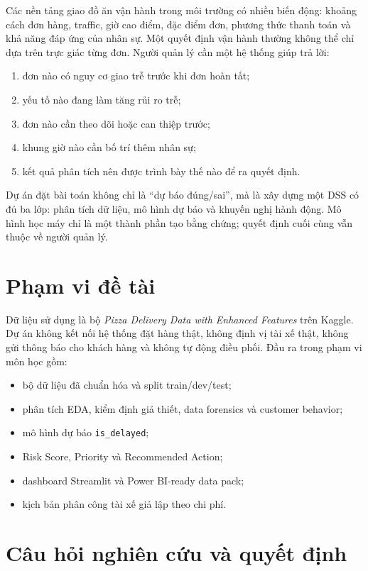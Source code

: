\documentclass[12pt,a4paper,oneside]{report}
\newcommand{\code}[1]{\nolinkurl{#1}}
\begin{document}
Các nền tảng giao đồ ăn vận hành trong môi trường có nhiều biến động: khoảng
cách đơn hàng, traffic, giờ cao điểm, đặc điểm đơn, phương thức thanh toán và
khả năng đáp ứng của nhân sự. Một quyết định vận hành thường không thể chỉ dựa
trên trực giác từng đơn. Người quản lý cần một hệ thống giúp trả lời:

\begin{enumerate}[leftmargin=*]
  \item đơn nào có nguy cơ giao trễ trước khi đơn hoàn tất;
  \item yếu tố nào đang làm tăng rủi ro trễ;
  \item đơn nào cần theo dõi hoặc can thiệp trước;
  \item khung giờ nào cần bố trí thêm nhân sự;
  \item kết quả phân tích nên được trình bày thế nào để ra quyết định.
\end{enumerate}

Dự án đặt bài toán không chỉ là ``dự báo đúng/sai'', mà là xây dựng một DSS có
đủ ba lớp: phân tích dữ liệu, mô hình dự báo và khuyến nghị hành động. Mô hình
học máy chỉ là một thành phần tạo bằng chứng; quyết định cuối cùng vẫn thuộc về
người quản lý.

\section{Phạm vi đề tài}

Dữ liệu sử dụng là bộ \emph{Pizza Delivery Data with Enhanced Features} trên
Kaggle. Dự án không kết nối hệ thống đặt hàng thật, không định vị tài xế thật,
không gửi thông báo cho khách hàng và không tự động điều phối. Đầu ra trong
phạm vi môn học gồm:

\begin{itemize}[leftmargin=*]
  \item bộ dữ liệu đã chuẩn hóa và split train/dev/test;
  \item phân tích EDA, kiểm định giả thiết, data forensics và customer behavior;
  \item mô hình dự báo \code{is\_delayed};
  \item Risk Score, Priority và Recommended Action;
  \item dashboard Streamlit và Power BI-ready data pack;
  \item kịch bản phân công tài xế giả lập theo chi phí.
\end{itemize}

\section{Câu hỏi nghiên cứu và quyết định}
\end{document}
